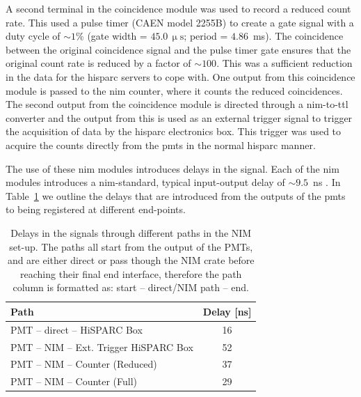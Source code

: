 A second terminal in the coincidence module was used to record a reduced count rate. This used a pulse timer (CAEN model 2255B) to create a gate signal with a duty cycle of $\sim 1\%$ (gate width = $45.0 \, \upmu\mathrm{s}$; period = $4.86$~ms). The coincidence between the original coincidence signal and the pulse timer gate ensures that the original count rate is reduced by a factor of $\sim 100$. This was a sufficient reduction in the data for the \gls{hisparc} servers to cope with. One output from this coincidence module is passed to the \gls{nim} counter, where it counts the reduced coincidences. The second output from the coincidence module is directed through a \gls{nim}-to-\gls{ttl} converter and the output from this is used as an external trigger signal to trigger the acquisition of data by the \gls{hisparc} electronics box. This trigger was used to acquire the counts directly from the \glspl{pmt} in the normal \gls{hisparc} manner.%

The use of these \gls{nim} modules introduces delays in the signal. Each of the \gls{nim} modules introduces a \gls{nim}-standard, typical input-output delay of $\sim 9.5$~ns \citep{lecroy_lecroy_1996, caen_technical_2011}. In Table~\ref{tab:HS_14008_delays} we outline the delays that are introduced from the outputs of the \glspl{pmt} to being registered at different end-points.

\vspace{1em}

\begin{table}[ht!]
	\begin{center}
		\caption{Delays in the signals through different paths in the NIM set-up. The paths all start from the output of the PMTs, and are either direct or pass though the NIM crate before reaching their final end interface, therefore the path column is formatted as: start -- direct/NIM path -- end.}
		\label{tab:HS_14008_delays}
		\begin{tabular}{l c }
			\hline 
			{\bf Path} & {\bf Delay [ns]} \\ 
			\hline 
			PMT -- direct -- HiSPARC Box &  16 \\ 
			PMT -- NIM -- Ext. Trigger HiSPARC Box & 52 \\ 
			PMT -- NIM -- Counter (Reduced) & 37 \\ 
			PMT -- NIM -- Counter (Full) & 29 \\ 
			\hline 
		\end{tabular} 
	\end{center}
\end{table}

